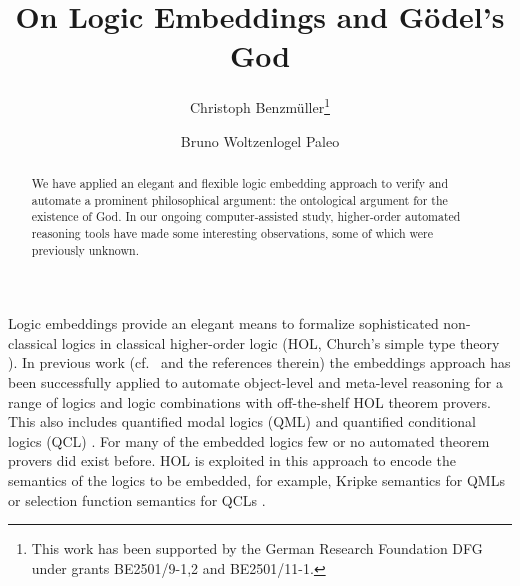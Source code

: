 \documentclass{llncs}
\begin{document}
\title{On Logic Embeddings and G\"odel's God}
\author{Christoph Benzm\"uller\thanks{This work has been supported by
    the German Research Foundation DFG under grants BE2501/9-1,2 and
    BE2501/11-1.} \and Bruno Woltzenlogel Paleo 
}


\maketitle            



\begin{abstract}
  We have applied an elegant and flexible  logic embedding
  approach to verify and automate a prominent philosophical argument:
  the ontological argument for the existence of God. In our ongoing
  computer-assisted study, higher-order automated reasoning tools have
  made some interesting observations, some of which were previously unknown.
\end{abstract}



%
%

Logic embeddings provide an elegant means to formalize sophisticated
non-classical logics in classical higher-order logic (HOL, Church's
simple type theory \cite{Church40}). In previous work (cf.~\cite{C35}
and the references therein) the embeddings approach has been
successfully applied to automate object-level and meta-level reasoning
for a range of logics and logic combinations with off-the-shelf HOL
theorem provers. This also includes quantified modal logics (QML)
\cite{J23} and quantified conditional logics (QCL) \cite{C37}.  For
many of the embedded logics few or no automated theorem provers did
exist before. HOL is exploited in this approach to encode the
semantics of the logics to be embedded, for example, Kripke semantics
for QMLs \cite{fitting98} or selection function semantics for QCLs
\cite{Stalnaker68}.  
\end{document}
